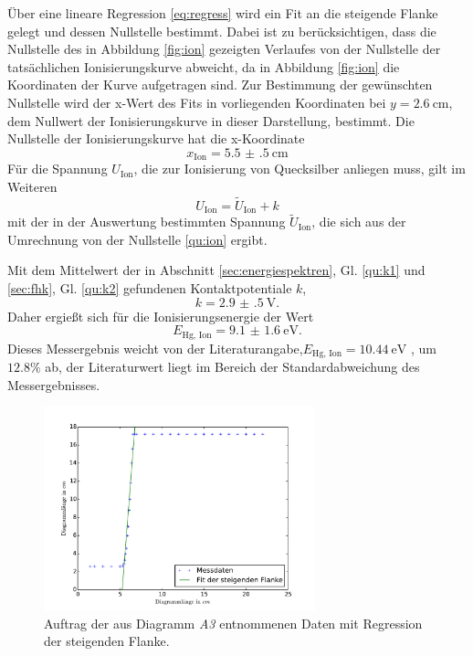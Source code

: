 Über eine lineare Regression \eqref{eq:regress} wird ein Fit an die steigende Flanke gelegt und dessen Nullstelle bestimmt.
Dabei ist zu berücksichtigen, dass die Nullstelle des in Abbildung \ref{fig:ion} gezeigten Verlaufes von der Nullstelle der tatsächlichen Ionisierungskurve abweicht, da in Abbildung \ref{fig:ion} die Koordinaten der Kurve aufgetragen sind.
Zur Bestimmung der gewünschten Nullstelle wird der x-Wert des Fits in vorliegenden Koordinaten bei $y=\SI{2.6}{\centi\meter}$, dem Nullwert der Ionisierungskurve in dieser Darstellung, bestimmt.
Die Nullstelle der Ionisierungskurve hat die x-Koordinate%
\begin{equation}
	x_\text{Ion}=\SI{5.5(5)}{\centi\meter}
	\label{qu:ion}
\end{equation}
Für die Spannung $U_\text{Ion}$, die zur Ionisierung von Quecksilber anliegen muss, gilt im Weiteren
\begin{equation}
	U_\text{Ion}=\tilde{U}_\text{Ion}+k
\end{equation}
mit der in der Auswertung bestimmten Spannung $\tilde{U}_\text{Ion}$, die sich aus der Umrechnung von der Nullstelle \ref{qu:ion} ergibt.

Mit dem Mittelwert der in Abschnitt \ref{sec:energiespektren}, Gl. \eqref{qu:k1} und \ref{sec:fhk}, Gl. \eqref{qu:k2} gefundenen Kontaktpotentiale $k$,
\begin{equation}
	k=\SI{2.9(5)}{\volt}.
\end{equation}
Daher ergießt sich für die Ionisierungsenergie der Wert
\begin{equation}
	E_\text{Hg, Ion}=\SI{9.1(16)}{\electronvolt}.
\end{equation}
Dieses Messergebnis weicht von der Literaturangabe,$E_\text{Hg, Ion}=\SI{10.44}{\electronvolt}$ \cite{IonHg}, um $12.8\%$ ab, 
der Literaturwert liegt im Bereich der Standardabweichung des Messergebnisses.
\begin{figure}[ht]
	\centering
	\includegraphics[width=0.7\textwidth]{Bilder/Vert_ion.pdf}
	\caption{Auftrag der aus Diagramm \emph{A3} entnommenen Daten mit Regression der steigenden Flanke. \cite{matplotlib}}
	\label{fig:E_vert_warm}
\end{figure}

